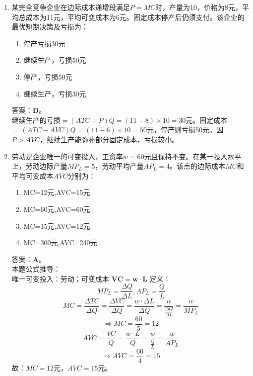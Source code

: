 \documentclass[cn,hazy,blue,14pt,screen]{elegantnote}
\begin{document}
\begin{enumerate}
    \item 某完全竞争企业在边际成本递增段满足$P=MC$时，产量为10，价格为8元，平均总成本为11元，平均可变成本为6元。固定成本停产后仍须支付。该企业的最优短期决策及亏损为：
    \begin{enumerate}[label={\Alph*.},topsep=0pt,itemsep=0pt]
        \item 停产亏损30元
        \item 继续生产，亏损50元
        \item 停产，亏损50元
        \item 继续生产，亏损30元
    \end{enumerate}
    答案：\textbf{D}。\\
    继续生产的亏损$=(ATC-P)Q=(11-8)\times10=30$元。固定成本$=(ATC-AVC)Q=(11-6)\times10=50$元，停产则亏损50元。因$P>AVC$，继续生产能弥补部分固定成本，亏损较小。

    \item 劳动是企业唯一的可变投入，工资率$w=60$元且保持不变。在某一投入水平上，劳动边际产量$MP_L=5$，劳动平均产量$AP_L=4$。该点的边际成本$MC$和平均可变成本$AVC$分别为：
    \begin{enumerate}[label={\Alph*.},topsep=0pt,itemsep=0pt]
        \item MC=12元,AVC=15元
        \item MC=60元,AVC=60元
        \item MC=15元,AVC=12元
        \item MC=300元,AVC=240元
    \end{enumerate}
    答案：\textbf{A}。\\
    本题公式推导：\\
    唯一可变投入：劳动；可变成本 \(\boldsymbol{VC = w\cdot L}\)
    定义：
    $$MP_L = \frac{\Delta Q}{\Delta L},AP_L = \frac{Q}{L}$$
    $$MC = \frac{\Delta TC}{\Delta Q} = \frac{\Delta VC}{\Delta Q} = \frac{w\cdot \Delta L}{\Delta Q} = \frac{w}{\frac{\Delta Q}{\Delta L}} =\frac{w}{MP_L}$$
    $$ \Rightarrow MC = \frac{60}{5} = 12$$
    $$ AVC = \frac{VC}{Q} = \frac{w\cdot L}{Q} = \frac{w}{\frac{Q}{L}} = \frac{w}{AP_L}$$
    $$ \Rightarrow AVC = \frac{60}{4} = 15$$
    故：$MC=12$元，$AVC=15$元。


\end{enumerate}
\end{document}
